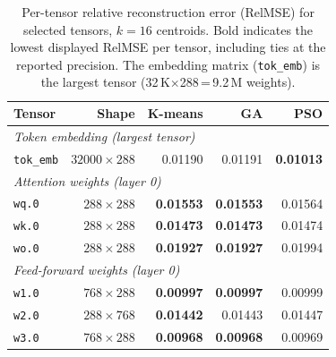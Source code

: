 %
%
%

\begin{table}[t]
\centering
\footnotesize
\caption{Per-tensor relative reconstruction error (RelMSE) for selected tensors,
         $k{=}16$ centroids. Bold indicates the lowest displayed RelMSE per tensor,
         including ties at the reported precision. The embedding matrix
         (\texttt{tok\_emb}) is the largest tensor (32\,K$\times$288\,=\,9.2\,M weights).}
\label{tab:relmse}
\setlength{\tabcolsep}{4pt}
\renewcommand{\arraystretch}{1.15}
\begin{tabular}{lrrrr}
\toprule
\textbf{Tensor} & \textbf{Shape} & \textbf{K-means} & \textbf{GA} & \textbf{PSO} \\
\midrule
\multicolumn{5}{l}{\textit{Token embedding (largest tensor)}} \\
\quad\texttt{tok\_emb}         & $32000\times288$ & 0.01190 & 0.01191 & \textbf{0.01013} \\
\midrule
\multicolumn{5}{l}{\textit{Attention weights (layer 0)}} \\
\quad\texttt{wq.0}              & $288\times288$   & \textbf{0.01553} & \textbf{0.01553} & 0.01564 \\
\quad\texttt{wk.0}              & $288\times288$   & \textbf{0.01473} & \textbf{0.01473} & 0.01474 \\
\quad\texttt{wo.0}              & $288\times288$   & \textbf{0.01927} & \textbf{0.01927} & 0.01994 \\
\midrule
\multicolumn{5}{l}{\textit{Feed-forward weights (layer 0)}} \\
\quad\texttt{w1.0}              & $768\times288$   & \textbf{0.00997} & \textbf{0.00997} & 0.00999 \\
\quad\texttt{w2.0}              & $288\times768$   & \textbf{0.01442} & 0.01443 & 0.01447 \\
\quad\texttt{w3.0}              & $768\times288$   & \textbf{0.00968} & \textbf{0.00968} & 0.00969 \\

\end{tabular}
\end{table}
